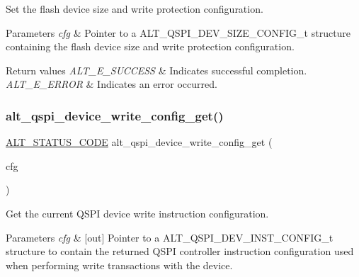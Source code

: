 Set the flash device size and write protection configuration.


\begin{DoxyParams}{Parameters}
{\em cfg} & Pointer to a A\+L\+T\+\_\+\+Q\+S\+P\+I\+\_\+\+D\+E\+V\+\_\+\+S\+I\+Z\+E\+\_\+\+C\+O\+N\+F\+I\+G\+\_\+t structure containing the flash device size and write protection configuration.\\
\hline
\end{DoxyParams}

\begin{DoxyRetVals}{Return values}
{\em A\+L\+T\+\_\+\+E\+\_\+\+S\+U\+C\+C\+E\+SS} & Indicates successful completion. \\
\hline
{\em A\+L\+T\+\_\+\+E\+\_\+\+E\+R\+R\+OR} & Indicates an error occurred. \\
\hline
\end{DoxyRetVals}
\mbox{\label{group__ALT__QSPI__DEV__CFG_gaf930e784718f5bb26125f4ad782c0d27}} 
\subsubsection{\texorpdfstring{alt\_qspi\_device\_write\_config\_get()}{alt\_qspi\_device\_write\_config\_get()}}
{\footnotesize\ttfamily \mbox{\hyperlink{hwlib_8h_abdb0d369f069723ca55d6c94bcaaaa12}{A\+L\+T\+\_\+\+S\+T\+A\+T\+U\+S\+\_\+\+C\+O\+DE}} alt\+\_\+qspi\+\_\+device\+\_\+write\+\_\+config\+\_\+get (\begin{DoxyParamCaption}\item[{\mbox{\hyperlink{group__ALT__QSPI__DEV__CFG_ga56516b11d66633580f54d1cc69c7aa8e}{A\+L\+T\+\_\+\+Q\+S\+P\+I\+\_\+\+D\+E\+V\+\_\+\+I\+N\+S\+T\+\_\+\+C\+O\+N\+F\+I\+G\+\_\+t}} $\ast$}]{cfg }\end{DoxyParamCaption})}

Get the current Q\+S\+PI device write instruction configuration.


\begin{DoxyParams}{Parameters}
{\em cfg} & \mbox{[}out\mbox{]} Pointer to a A\+L\+T\+\_\+\+Q\+S\+P\+I\+\_\+\+D\+E\+V\+\_\+\+I\+N\+S\+T\+\_\+\+C\+O\+N\+F\+I\+G\+\_\+t structure to contain the returned Q\+S\+PI controller instruction configuration used when performing write transactions with the device.\\
\hline
\end{DoxyParams}

